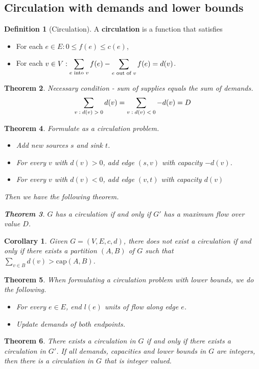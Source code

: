 \documentclass[10pt, oneside, reqno]{amsart}
\theoremstyle{plain}%
\newtheorem{thm}{Theorem}[section]
\newtheorem*{cor}{Corollary}
\theoremstyle{definition}
\newtheorem{defn}[thm]{Definition}
\theoremstyle{remark}
\begin{document}


\subsection{Circulation with demands and lower bounds} %
\label{sub:circulation_with_demands_and_lower_bounds}

\begin{defn}[Circulation]
	A \textbf{circulation} is a function that satisfies 
	\begin{itemize}
		\item For each $e \in E: 0 \leq f(e) \leq c(e)$,
		
		\item For each $v \in V: \displaystyle\sum_{\text{$e$ into $v$}} f(e) - \displaystyle\sum_{\text{$e$ out of $v$}}f(e) = d(v)$.
	\end{itemize}
\end{defn}

\begin{thm}
	Necessary condition - sum of supplies equals the sum of demands.
	\[
		\displaystyle\sum_{\text{$v: d(v) > 0$}} d(v) = \displaystyle\sum_{\text{$v: d(v) < 0$}} -d(v) = D
	\]
\end{thm}

\begin{thm}
	Formulate as a circulation problem.
	\begin{itemize}
		\item Add new sources $s$ and sink $t$.
		\item For every $v$ with $d(v) > 0$, add edge $(s,v)$ with capacity $-d(v)$.
		\item For every $v$ with $d(v) < 0$, add edge $(v,t)$ with capacity $d(v)$
	\end{itemize}
	
	Then we have the following theorem.
	\begin{thm}
		$G$ has a circulation if and only if $G'$ has a maximum flow over value $D$.
 	\end{thm}
\end{thm}

\begin{cor}
	Given $G = (V,E,c,d)$, there does not exist a circulation if and only if there exists a partition $(A,B)$ of $G$ such that $\sum_{v \in B} d(v) > \text{cap}(A,B)$.
\end{cor}

\begin{thm}
	When formulating a circulation problem with lower bounds, we do the following.
	\begin{itemize}
		\item For every $e \in E$, end $l(e)$ units of flow along edge $e$.
		\item Update demands of both endpoints.
	\end{itemize}
\end{thm}
\begin{thm}
	There exists a circulation in $G$ if and only if there exists a circulation in $G'$.  If all demands, capacities and lower bounds in $G$ are integers, then there is a circulation in $G$ that is integer valued.
\end{thm}
\end{document}
